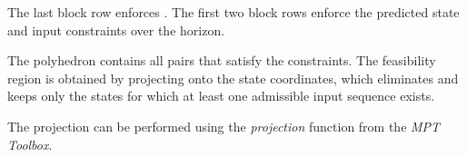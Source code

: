 \noindent
The last block row enforces . The first two block rows enforce the predicted state and input constraints over the horizon.

The polyhedron  contains all pairs  that satisfy the constraints. The feasibility region  is obtained by projecting  onto the state coordinates, which eliminates  and keeps only the states for which at least one admissible input sequence exists.

The projection can be performed using the \textit{projection} function from the \textit{MPT Toolbox}.
